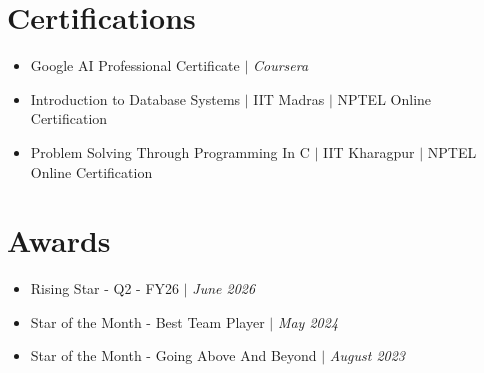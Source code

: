 \documentclass[letterpaper,11pt]{article}
\newcommand{\resumeItem}[1]{
  \item\small{
    {#1 \vspace{-2pt}}
  }
}
\newcommand{\resumeItemListStart}{\begin{itemize}}
\newcommand{\resumeItemListEnd}{\end{itemize}\vspace{-5pt}}
\begin{document}
\section{Certifications}
    \vspace{-5pt}
          \resumeItemListStart    
          \resumeItem{Google AI Professional Certificate $|$ \emph{Coursera}}
          \resumeItem{Introduction to Database Systems $|$ IIT Madras $|$ NPTEL Online Certification}
        \resumeItem{Problem Solving Through Programming In C $|$ IIT Kharagpur $|$ NPTEL Online Certification}
          \resumeItemListEnd 
          \vspace{-16pt}


\section{Awards}
            \resumeItemListStart
                \resumeItem{Rising Star - Q2 - FY26 $|$ \emph{June 2026}}
                \resumeItem{Star of the Month - Best Team Player $|$ \emph{May  2024}}
                \resumeItem{Star of the Month -   Going Above And Beyond $|$ \emph{August  2023}}
            \resumeItemListEnd
\end{document}
